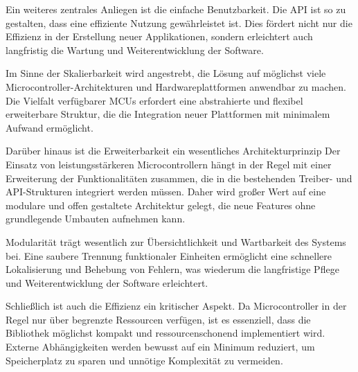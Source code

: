 Ein weiteres zentrales Anliegen ist die einfache Benutzbarkeit. 
Die API ist so zu gestalten, dass eine effiziente Nutzung gewährleistet ist. 
Dies fördert nicht nur die Effizienz in der Erstellung neuer Applikationen, sondern erleichtert auch langfristig die Wartung und Weiterentwicklung der Software.

Im Sinne der Skalierbarkeit wird angestrebt, die Lösung auf möglichst viele Microcontroller-Architekturen und Hardwareplattformen anwendbar zu machen.
Die Vielfalt verfügbarer MCUs erfordert eine abstrahierte und flexibel erweiterbare Struktur, die die Integration neuer Plattformen mit minimalem Aufwand ermöglicht.


Darüber hinaus ist die Erweiterbarkeit ein wesentliches Architekturprinzip
Der Einsatz von leistungsstärkeren Microcontrollern hängt in der Regel mit einer Erweiterung der Funktionalitäten zusammen, die in die bestehenden Treiber- und API-Strukturen integriert werden müssen.
Daher wird großer Wert auf eine modulare und offen gestaltete Architektur gelegt, die neue Features ohne grundlegende Umbauten aufnehmen kann.

Modularität trägt wesentlich zur Übersichtlichkeit und Wartbarkeit des Systems bei. 
Eine saubere Trennung funktionaler Einheiten ermöglicht eine schnellere Lokalisierung und Behebung von Fehlern, was wiederum die langfristige Pflege und Weiterentwicklung der Software erleichtert.

Schließlich ist auch die Effizienz ein kritischer Aspekt.
Da Microcontroller in der Regel nur über begrenzte Ressourcen verfügen, ist es essenziell, dass die Bibliothek möglichst kompakt und ressourcenschonend implementiert wird. 
Externe Abhängigkeiten werden bewusst auf ein Minimum reduziert, um Speicherplatz zu sparen und unnötige Komplexität zu vermeiden.

